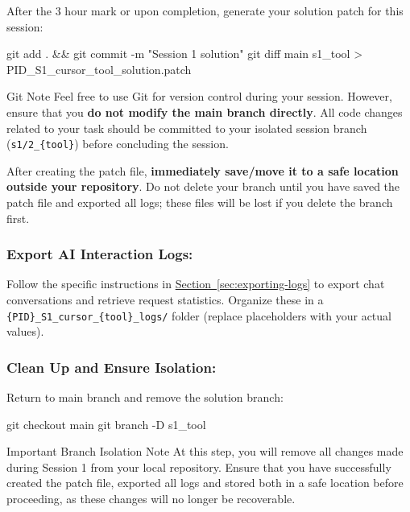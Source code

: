 \documentclass[11pt, a4paper]{article}
\begin{document}
    After the 3 hour mark or upon completion, generate your solution patch for this session:
    \begin{codebox}
git add . && git commit -m "Session 1 solution"     
git diff main s1_{tool} > {PID}_S1_cursor_{tool}_solution.patch
    \end{codebox}

\newpage

    \begin{mainbox}{Git Note}
Feel free to use Git for version control during your session. However, ensure that you \textbf{do not modify the main branch directly}. All code changes related to your task should be committed to your isolated session branch (\texttt{s1/2\_\{tool\}}) before concluding the session.\newline

\noindent After creating the patch file, \textbf{immediately save/move it to a safe location outside your repository}. Do not delete your branch until you have saved the patch file and exported all logs; these files will be lost if you delete the branch first.
    \end{mainbox}

\subsubsection*{Export AI Interaction Logs:}

Follow the specific instructions in \hyperref[sec:exporting-logs]{Section~\ref*{sec:exporting-logs}} to export chat conversations and retrieve request statistics. Organize these in a \verb|{PID}_S1_cursor_{tool}_logs/| folder (replace placeholders with your actual values).

\subsubsection*{Clean Up and Ensure Isolation:}
    
    Return to main branch and remove the solution branch:
    \begin{codebox}
git checkout main
git branch -D s1_{tool}
    \end{codebox}
        \begin{mainbox}{Important Branch Isolation Note}
At this step, you will remove all changes made during Session 1 from your local repository. Ensure that you have successfully created the patch file, exported all logs and stored both in a safe location before proceeding, as these changes will no longer be recoverable.
        \end{mainbox}
\end{document}
